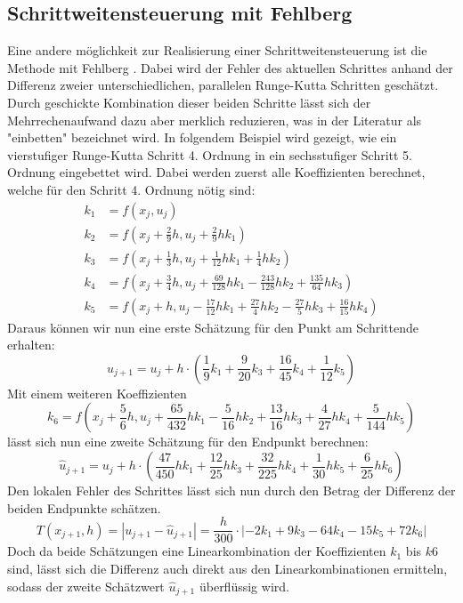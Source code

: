 \subsection{Schrittweitensteuerung mit Fehlberg
  \label{steps:subsection:fehlberg}}
Eine andere möglichkeit zur Realisierung einer Schrittweitensteuerung ist die Methode mit Fehlberg
\cite{steps:Numerische-Mathematik}.
Dabei wird der Fehler des aktuellen Schrittes anhand der Differenz zweier unterschiedlichen, parallelen
Runge-Kutta Schritten geschätzt. Durch geschickte Kombination dieser beiden Schritte
lässt sich der Mehrrechenaufwand dazu aber merklich reduzieren, was in der Literatur als "einbetten" bezeichnet wird.
In folgendem Beispiel wird gezeigt, wie ein vierstufiger Runge-Kutta Schritt 4. Ordnung in ein sechsstufiger Schritt 5. Ordnung eingebettet wird.
Dabei werden zuerst alle Koeffizienten berechnet, welche für den Schritt 4. Ordnung nötig sind:
\begin{align*}
  k_1 & =f(x_j, u_j)                                                                           \\
  k_2 & =f(x_j + \frac{2}{9}h, u_j+\frac{2}{9}hk_1)                                            \\
  k_3 & =f(x_j + \frac{1}{3}h, u_j+\frac{1}{12}hk_1+\frac{1}{4}hk_2)                           \\
  k_4 & =f(x_j + \frac{3}{4}h, u_j+\frac{69}{128}hk_1-\frac{243}{128}hk_2+\frac{135}{64}hk_3)  \\
  k_5 & =f(x_j + h, u_j-\frac{17}{12}hk_1+\frac{27}{4}hk_2-\frac{27}{5}hk_3+\frac{16}{15}hk_4)
\end{align*}
Daraus können wir nun eine erste Schätzung für den Punkt am Schrittende erhalten:
\[
  u_{j+1} =u_j +h\cdot(\frac{1}{9}k_1+\frac{9}{20}k_3+\frac{16}{45}k_4+\frac{1}{12}k_5)
\]
Mit einem weiteren Koeffizienten
\[
  k_6 =f(x_j + \frac{5}{6}h, u_j+\frac{65}{432}hk_1-\frac{5}{16}hk_2+\frac{13}{16}hk_3+\frac{4}{27}hk_4+\frac{5}{144}hk_5)
\]
lässt sich nun eine zweite Schätzung für den Endpunkt berechnen:
\[
  \hat{u}_{j+1} =u_j+h\cdot(\frac{47}{450}hk_1+\frac{12}{25}hk_3+\frac{32}{225}hk_4+\frac{1}{30}hk_5+\frac{6}{25}hk_6)
\]
Den lokalen Fehler des Schrittes lässt sich nun durch den Betrag der Differenz der beiden Endpunkte schätzen.
\[
  T(x_{j+1},h)=|u_{j+1}-\hat{u}_{j+1}|=\frac{h}{300}\cdot|-2k_1+9k_3-64k_4-15k_5+72k_6|
\]
Doch da beide Schätzungen eine Linearkombination der Koeffizienten $k_1$ bis $k6$ sind,
lässt sich die Differenz auch direkt aus den Linearkombinationen ermitteln,
sodass der zweite Schätzwert $\hat{u}_{j+1}$ überflüssig wird.


